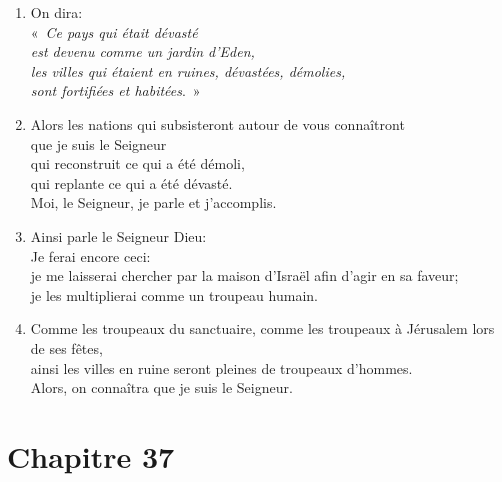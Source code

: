 \begin{enumerate}[leftmargin=\psleftmargin, labelsep = \pslabelsep, label={\arabic*}, font=\color{\pscolor}\small\textsuperscript, parsep=0em, itemsep=0em, topsep=0em ]
    \item On dira: \\ \decalage «~\textit{Ce pays qui était dévasté \\ \decalage est devenu comme un jardin d’Eden, \\\decalage les villes qui étaient en ruines, dévastées, démolies, \\ \decalage sont fortifiées et habitées}.~»
    \item Alors les nations qui subsisteront autour de vous connaîtront \\ que je suis le Seigneur \\ \decalage qui reconstruit ce qui a été démoli, \\ \decalage qui replante ce qui a été dévasté. \\ Moi, le Seigneur, je parle et j’accomplis. \parSpace
    \item  Ainsi parle le Seigneur Dieu: \\ Je ferai encore ceci: \\ je me laisserai chercher par la maison d’Israël afin d’agir en sa faveur; \\ je les multiplierai comme un troupeau humain.
    \item Comme les troupeaux du sanctuaire, comme les troupeaux à Jérusalem lors de ses fêtes, \\ ainsi les villes en ruine seront pleines de troupeaux d’hommes. \\ Alors, on connaîtra que je suis le Seigneur.
\end{enumerate}
\newpage

\section*{Chapitre 37}
